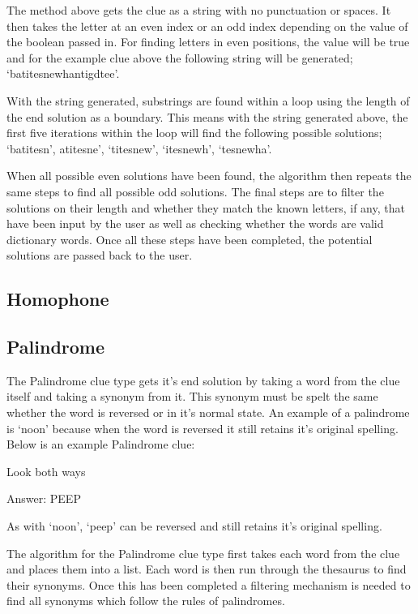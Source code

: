 The method above gets the clue as a string with no punctuation or spaces.
It then takes the letter at an even index or an odd index depending on 
the value of the boolean passed in. For finding letters in even positions, 
the value will be true and for the example clue above the following string 
will be generated; `batitesnewhantigdtee'. 

With the string generated, substrings are found within a loop using 
the length of the end solution as a boundary. This means with the 
string generated above, the first five iterations within the loop will 
find the following possible solutions; `batitesn', atitesne', `titesnew', 
`itesnewh', `tesnewha'. 

When all possible even solutions have been found, the algorithm then 
repeats the same steps to find all possible odd solutions. The final steps 
are to filter the solutions on their length and whether they match the known 
letters, if any, that have been input by the user as well as checking 
whether the words are valid dictionary words. Once all these steps 
have been completed, the potential solutions are passed back to the user. 

\subsection{Homophone}

\subsection{Palindrome}

The Palindrome clue type gets it's end solution by taking a word from 
the clue itself and taking a synonym from it. This synonym must be 
spelt the same whether the word is reversed or in it's normal state. 
An example of a palindrome is `noon' because when the word is reversed 
it still retains it's original spelling. Below is an example Palindrome clue:

Look both ways

Answer: PEEP

As with `noon', `peep' can be reversed and still retains it's original spelling. 

The algorithm for the Palindrome clue type first takes each word 
from the clue and places them into a list. Each word is then run through 
the thesaurus to find their synonyms. Once this has been completed a 
filtering mechanism is needed to find all synonyms which follow the 
rules of palindromes. 

